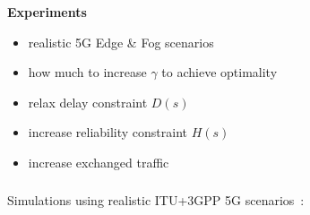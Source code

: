 \documentclass[aspectratio=169]{beamer}
\begin{document}
\begin{frame}
    \frametitle{\secname}
    \framesubtitle{\subsecname}

    \textbf{Experiments}
    \begin{itemize}
        \item realistic 5G Edge \& Fog scenarios
        \item how much to increase $\gamma$ to achieve optimality
        \item relax delay constraint $D(s)$
        \item increase reliability constraint $H(s)$
        \item increase exchanged traffic
    \end{itemize}
\end{frame}


\begin{frame}
    \frametitle{\secname}
    \framesubtitle{\subsecname}
    Simulations using realistic ITU+3GPP 5G scenarios~\cite{modelling-bs}:
    \begin{figure}[ht]
        \hspace{3em}

\end{figure}
\end{frame}
\end{document}
